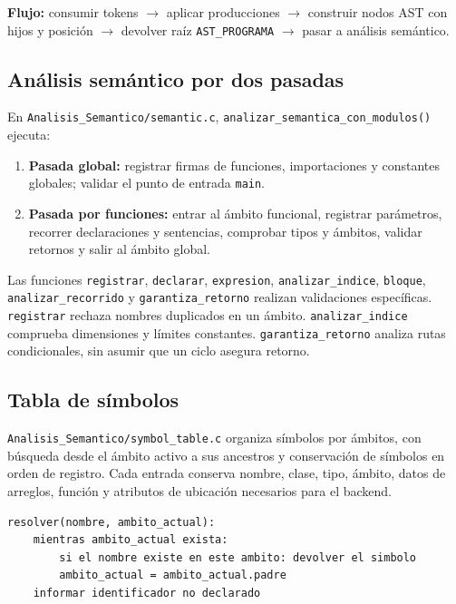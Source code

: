 \textbf{Flujo:} consumir tokens $\rightarrow$ aplicar producciones $\rightarrow$ construir nodos
AST con hijos y posición $\rightarrow$ devolver raíz
\texttt{AST\_PROGRAMA} $\rightarrow$ pasar a análisis semántico.

\subsection{Análisis semántico por dos
pasadas}\label{53-ana1isis-semantico-por-dos-pasadas}

En \texttt{Analisis\_Semantico/semantic.c},
\texttt{analizar\_semantica\_con\_modulos()} ejecuta:

\begin{enumerate}
\def\labelenumi{\arabic{enumi}.}
\tightlist
\item
  \textbf{Pasada global:} registrar firmas de funciones, importaciones y
  constantes globales; validar el punto de entrada
  \texttt{main}.
\item
  \textbf{Pasada por funciones:} entrar al ámbito funcional, registrar
  parámetros, recorrer declaraciones y sentencias, comprobar tipos y
  ámbitos, validar retornos y salir al ámbito global.
\end{enumerate}

Las funciones \texttt{registrar},
\texttt{declarar}, \texttt{expresion},
\texttt{analizar\_indice},
\texttt{bloque},
\texttt{analizar\_recorrido} y
\texttt{garantiza\_retorno} realizan validaciones
específicas. \texttt{registrar} rechaza nombres
duplicados en un ámbito. \texttt{analizar\_indice}
comprueba dimensiones y límites constantes.
\texttt{garantiza\_retorno} analiza rutas
condicionales, sin asumir que un ciclo asegura retorno.

\subsection{Tabla de símbolos}\label{54-tabla-de-suxedmbolos}

\texttt{Analisis\_Semantico/symbol\_table.c} organiza
símbolos por ámbitos, con búsqueda desde el ámbito activo a sus
ancestros y conservación de símbolos en orden de registro. Cada entrada
conserva nombre, clase, tipo, ámbito, datos de arreglos, función y
atributos de ubicación necesarios para el backend.

\begin{lstlisting}
resolver(nombre, ambito_actual):
    mientras ambito_actual exista:
        si el nombre existe en este ambito: devolver el simbolo
        ambito_actual = ambito_actual.padre
    informar identificador no declarado
\end{lstlisting}

